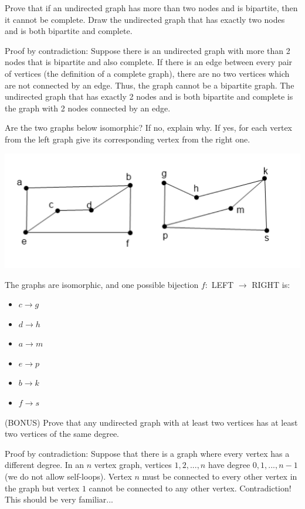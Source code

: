 \documentclass[solution, letterpaper]{cs20inclass}
\begin{document}
\problem Prove that if an undirected graph has more than two nodes and is bipartite, then it cannot be complete. Draw the undirected graph that has exactly two nodes and is both bipartite and complete.

\solution Proof by contradiction: Suppose there is an undirected graph with more than 2 nodes that is bipartite and also complete. If there is an edge between every pair of vertices (the definition of a complete graph), there are no two vertices which are not connected by an edge. Thus, the graph cannot be a bipartite graph. The undirected graph that has exactly 2 nodes and is both bipartite and complete is the graph with 2 nodes connected by an edge.

\problem Are the two graphs below isomorphic? If no, explain why. If yes, for each vertex from the left graph give its corresponding vertex from the right one.
\begin{center}
\includegraphics[scale=0.5]{isomorphisms.png}
\end{center}

\solution The graphs are isomorphic, and one possible bijection $f: $ LEFT $ \rightarrow $ RIGHT is:
\begin{itemize}
\item[] $ c \rightarrow g $
\item[] $ d \rightarrow h $
\item[] $ a \rightarrow m $
\item[] $ e \rightarrow p $
\item[] $ b \rightarrow k $
\item[] $ f \rightarrow s $
\end{itemize}

\problem (BONUS) Prove that any undirected graph with at least two vertices has at least two vertices of the same degree.

\begin{solution} Proof by contradiction: Suppose that there is a graph where every vertex has a different degree. In an $n$ vertex graph, vertices $1, 2, ..., n$ have degree $0, 1, ..., n-1$ (we do not allow self-loops). Vertex $n$ must be connected to every other vertex in the graph but vertex $1$ cannot be connected to any other vertex. Contradiction! This should be very familiar...
\end{solution}
\end{document}
